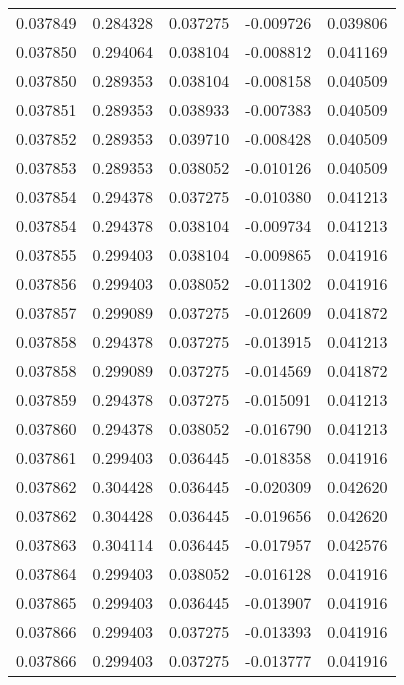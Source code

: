 \begin{tabular}{lrrrr}
0.037849    &  0.284328 &  0.037275 & -0.009726 &             0.039806 \\
0.037850    &  0.294064 &  0.038104 & -0.008812 &             0.041169 \\
0.037850    &  0.289353 &  0.038104 & -0.008158 &             0.040509 \\
0.037851    &  0.289353 &  0.038933 & -0.007383 &             0.040509 \\
0.037852    &  0.289353 &  0.039710 & -0.008428 &             0.040509 \\
0.037853    &  0.289353 &  0.038052 & -0.010126 &             0.040509 \\
0.037854    &  0.294378 &  0.037275 & -0.010380 &             0.041213 \\
0.037854    &  0.294378 &  0.038104 & -0.009734 &             0.041213 \\
0.037855    &  0.299403 &  0.038104 & -0.009865 &             0.041916 \\
0.037856    &  0.299403 &  0.038052 & -0.011302 &             0.041916 \\
0.037857    &  0.299089 &  0.037275 & -0.012609 &             0.041872 \\
0.037858    &  0.294378 &  0.037275 & -0.013915 &             0.041213 \\
0.037858    &  0.299089 &  0.037275 & -0.014569 &             0.041872 \\
0.037859    &  0.294378 &  0.037275 & -0.015091 &             0.041213 \\
0.037860    &  0.294378 &  0.038052 & -0.016790 &             0.041213 \\
0.037861    &  0.299403 &  0.036445 & -0.018358 &             0.041916 \\
0.037862    &  0.304428 &  0.036445 & -0.020309 &             0.042620 \\
0.037862    &  0.304428 &  0.036445 & -0.019656 &             0.042620 \\
0.037863    &  0.304114 &  0.036445 & -0.017957 &             0.042576 \\
0.037864    &  0.299403 &  0.038052 & -0.016128 &             0.041916 \\
0.037865    &  0.299403 &  0.036445 & -0.013907 &             0.041916 \\
0.037866    &  0.299403 &  0.037275 & -0.013393 &             0.041916 \\
0.037866    &  0.299403 &  0.037275 & -0.013777 &             0.041916 \\

\end{tabular}
